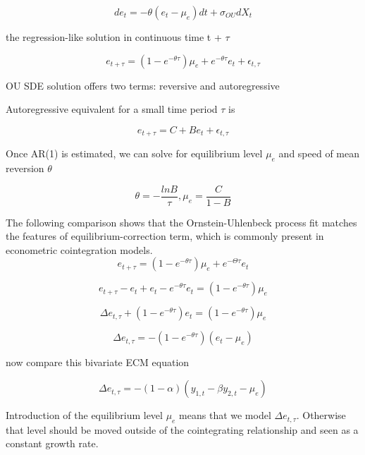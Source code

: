 \documentclass[a4paper, 11pt]{article}
\begin{document}
\begin{equation} \label{eq:eq1} de_t = -\theta(e_t - \mu_e) dt + \sigma_{OU} dX_t \end{equation} 

the regression-like solution in continuous time t + $\tau$ 

\begin{equation} \label{eq:eq2} e_{t+\tau} = (1 -e^{-\theta \tau}) \mu_e + e^{-\theta \tau} e_t + \epsilon_{t,\tau}\end{equation} 

OU SDE solution offers two terms: reversive and autoregressive

Autoregressive equivalent for a small time period $\tau$ is

\begin{equation} \label{eq:eq3} e_{t+\tau} = C + B e_t + \epsilon_{t,\tau} \end{equation}

Once AR(1) is estimated, we can solve for equilibrium level $\mu_e$  and speed of mean reversion $\theta$

$$ \theta = - \frac{ln B}{\tau}, \mu_e = \frac{C}{1-B}$$ 

The following comparison shows that the Ornstein-Uhlenbeck process fit matches the features of equilibrium-correction term, which is commonly present in econometric cointegration models.
\begin{equation} \label{eq:eq4} e_{t+\tau} = (1 -e^{-\theta \tau}) \mu_e + e^{-\Theta \tau} e_t \end{equation} 

\begin{equation} \label{eq:eq5} e_{t+\tau} - e_t + e_t -e^{-\theta \tau} e_t = (1 -e^{-\theta \tau}) \mu_e \end{equation} 

\begin{equation} \label{eq:eq6} \Delta e_{t,\tau} + (1-e^{-\theta \tau})e_t = (1 -e^{-\theta \tau}) \mu_e \end{equation}

\begin{equation} \label{eq:eq7} \Delta e_{t,\tau} = - (1 -e^{-\theta \tau})(e_t -\mu_e) \end{equation}

now compare this bivariate ECM equation

\begin{equation} \label{eq:eq8} \Delta e_{t,\tau} = -(1-\alpha) (y_{1,t} - \beta y_{2,t} - \mu_e) \end{equation}

Introduction of the equilibrium level $\mu_e$ means that we model $\Delta e_{t,\tau}$. Otherwise that level should be moved outside of the cointegrating relationship and seen as a constant growth rate.
\end{document}
